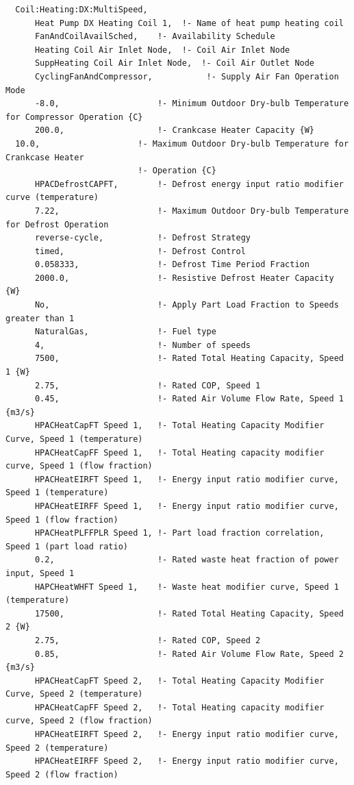 \begin{lstlisting}
  Coil:Heating:DX:MultiSpeed,
      Heat Pump DX Heating Coil 1,  !- Name of heat pump heating coil
      FanAndCoilAvailSched,    !- Availability Schedule
      Heating Coil Air Inlet Node,  !- Coil Air Inlet Node
      SuppHeating Coil Air Inlet Node,  !- Coil Air Outlet Node
      CyclingFanAndCompressor,           !- Supply Air Fan Operation Mode
      -8.0,                    !- Minimum Outdoor Dry-bulb Temperature for Compressor Operation {C}
      200.0,                   !- Crankcase Heater Capacity {W}
  10.0,                    !- Maximum Outdoor Dry-bulb Temperature for Crankcase Heater
                           !- Operation {C}
      HPACDefrostCAPFT,        !- Defrost energy input ratio modifier curve (temperature)
      7.22,                    !- Maximum Outdoor Dry-bulb Temperature for Defrost Operation
      reverse-cycle,           !- Defrost Strategy
      timed,                   !- Defrost Control
      0.058333,                !- Defrost Time Period Fraction
      2000.0,                  !- Resistive Defrost Heater Capacity {W}
      No,                      !- Apply Part Load Fraction to Speeds greater than 1
      NaturalGas,              !- Fuel type
      4,                       !- Number of speeds
      7500,                    !- Rated Total Heating Capacity, Speed 1 {W}
      2.75,                    !- Rated COP, Speed 1
      0.45,                    !- Rated Air Volume Flow Rate, Speed 1 {m3/s}
      HPACHeatCapFT Speed 1,   !- Total Heating Capacity Modifier Curve, Speed 1 (temperature)
      HPACHeatCapFF Speed 1,   !- Total Heating capacity modifier curve, Speed 1 (flow fraction)
      HPACHeatEIRFT Speed 1,   !- Energy input ratio modifier curve, Speed 1 (temperature)
      HPACHeatEIRFF Speed 1,   !- Energy input ratio modifier curve, Speed 1 (flow fraction)
      HPACHeatPLFFPLR Speed 1, !- Part load fraction correlation, Speed 1 (part load ratio)
      0.2,                     !- Rated waste heat fraction of power input, Speed 1
      HAPCHeatWHFT Speed 1,    !- Waste heat modifier curve, Speed 1 (temperature)
      17500,                   !- Rated Total Heating Capacity, Speed 2 {W}
      2.75,                    !- Rated COP, Speed 2
      0.85,                    !- Rated Air Volume Flow Rate, Speed 2 {m3/s}
      HPACHeatCapFT Speed 2,   !- Total Heating Capacity Modifier Curve, Speed 2 (temperature)
      HPACHeatCapFF Speed 2,   !- Total Heating capacity modifier curve, Speed 2 (flow fraction)
      HPACHeatEIRFT Speed 2,   !- Energy input ratio modifier curve, Speed 2 (temperature)
      HPACHeatEIRFF Speed 2,   !- Energy input ratio modifier curve, Speed 2 (flow fraction)

\end{lstlisting}
